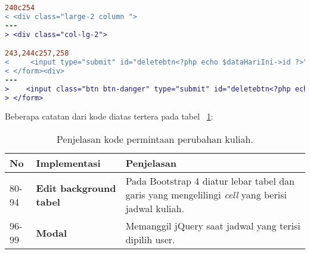\begin{lstlisting}[language=diff, caption=Kode untuk Halaman Entri Jadwal Dosen,  basicstyle=\ttfamily, frame=single,
columns=fullflexible, keepspaces=true, breaklines=true, label={lst:mainEntriJadwalDosen}]
240c254
< <div class="large-2 column ">
---
> <div class="col-lg-2">

243,244c257,258
<     <input type="submit" id="deletebtn<?php echo $dataHariIni->id ?>" name="deletebtn<?php echo $dataHariIni->id ?>" class="alert button" value="Delete">
< </form><div>
---
>    <input class="btn btn-danger" type="submit" id="deletebtn<?php echo $dataHariIni->id ?>" name="deletebtn<?php echo $dataHariIni->id ?>" value="Delete">
> </form>
\end{lstlisting}

Beberapa catatan dari kode diatas tertera pada tabel ~\ref{tabel:lst:entriJadwalDosen}:
\begin{table}[H]
	\centering
	\begin{tabularx}{\textwidth}{llX}
		\toprule
		No & Implementasi     & Penjelasan \\
		\midrule
		80-94 & \textbf{Edit background tabel}  & Pada Bootstrap 4 diatur lebar tabel dan garis yang mengelilingi \textit{cell} yang berisi jadwal kuliah.\\
		96-99 & \textbf{Modal}  & Memanggil jQuery saat jadwal yang terisi dipilih user.\\
		\bottomrule
	\end{tabularx}%
	\caption{Penjelasan kode permintaan perubahan kuliah.}
	\label{tabel:lst:entriJadwalDosen}
\end{table}

